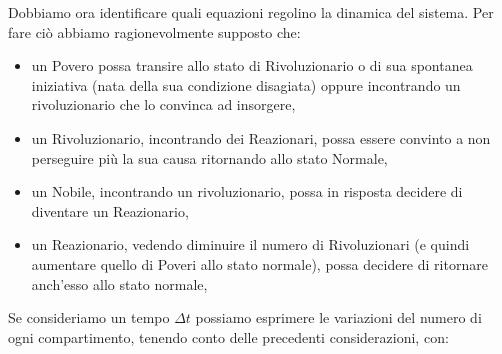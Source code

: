Dobbiamo ora identificare quali equazioni regolino la dinamica del sistema. Per fare ciò abbiamo ragionevolmente supposto che:
\begin{itemize}
	\item un Povero possa transire allo stato di Rivoluzionario o di sua spontanea iniziativa (nata della sua condizione disagiata) oppure incontrando un rivoluzionario che lo convinca ad insorgere,
	\item un Rivoluzionario, incontrando dei Reazionari, possa essere convinto a non perseguire più la sua causa ritornando allo stato Normale,
	\item un Nobile, incontrando un rivoluzionario, possa in risposta decidere di diventare un Reazionario,
	\item un Reazionario, vedendo diminuire il numero di Rivoluzionari (e quindi aumentare quello di Poveri allo stato normale), possa decidere di ritornare anch'esso allo stato normale,
\end{itemize}
Se consideriamo un tempo $\Delta t$ possiamo esprimere le variazioni del numero di ogni compartimento, tenendo conto delle precedenti considerazioni, con:

